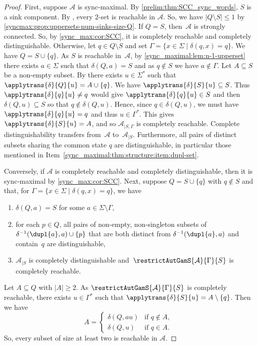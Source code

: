 \begin{proof}	
	First, suppose $\mathcal A$ is sync-maximal.
	By \cref{prelim:thm:SCC_sync_words}, $S$ is a sink component.
	By ,
	every $2$-set is reachable in $\mathcal A$.
	So, we have $|Q \setminus S| \le 1$ by \cref{syncmax:prop:uppersets-num-sinks-size-Q}.
	If $Q = S$, then~$\mathcal A$ is strongly connected.
	So, by \cref{sync_max:cor:SCC}, it is completely reachable
	and completely distinguishable.
	Otherwise, let $q \in Q \setminus S$ and set $\Gamma = \{ x \in \Sigma \mid \delta(q, x) = q \}$.
	We have $Q = S \cup \{q\}$.
	As $S$ is reachable in~$\mathcal A$, by \cref{sync_maximal:lem:n-1-upperset} there
	exists $a \in \Sigma$ such that $\delta(Q, a) = S$
	and as $q \notin S$ we have $a \notin \Gamma$.
	Let $A \subseteq S$ be a non-empty
	subset. By 
	there exists $u \in \Sigma^*$ such that
	$\applytrans{\delta}{Q}{u} = A \cup \{q\}$.
	We have $\applytrans{\delta}{S}{u} \subseteq S$.
	Thus $\applytrans{\delta}{q}{u} \ne q$
	would give $\applytrans{\delta}{q}{u} \in S$
	and then $\delta(Q, u) \subseteq S$
	so that $q \notin \delta(Q, u)$.
	Hence, since $q \in \delta(Q, u)$, we must have $\applytrans{\delta}{q}{u} = q$ and 
	thus $u \in \Gamma^*$.
	This gives $\applytrans{\delta}{S}{u} = A$, and so 
	$\mathcal A_{|S, \Gamma}$ is completely reachable. 
	Complete distinguishability transfers from~$\mathcal A$
	to~$\mathcal A_{|S}$.
	Furthermore, all pairs of distinct subsets sharing the common state $q$
	are distinguishable, in particular those mentioned in Item~\ref{sync_maximal:thm:structure:item:dupl-set}.
		
	Conversely, if $\mathcal A$ is completely reachable and completely
	distinguishable, then it is sync-maximal by \cref{sync_max:cor:SCC}.
	Next, suppose $Q = S \cup \{q\}$ with $q \notin S$ and that,
	for $\Gamma = \{ x \in \Sigma \mid \delta(q, x) = q \}$, we have
	\begin{enumerate}
	\item $\delta(Q, a) = S$ for some $a \in \Sigma \setminus \Gamma$,
	
	\item for each $p \in Q$, all pairs of non-empty, non-singleton subsets
	of $\delta^{-1}(\dupl{a}, a) \cup \{p\}$ that are both distinct from
	$\delta^{-1}(\dupl{a}, a)$ and contain~$q$ are distinguishable,
	
	\item $\mathcal A_{|S}$ is completely
	distinguishable and~$\restrictAutGamS{\mathcal A}{\Gamma}{S}$ is completely reachable.
	\end{enumerate}
	Let $A \subseteq Q$ with $|A| \ge 2$.
	As $\restrictAutGamS{\mathcal A}{\Gamma}{S}$ is completely reachable,
	there exists $u \in \Gamma^*$ such that $\applytrans{\delta}{S}{u} = A \setminus \{q\}$.
	Then we have
	\[
	A = \begin{cases}
		\delta(Q, au) & \text{if } q \notin A, \\
		\delta(Q, u)  & \text{if } q \in A.		
	\end{cases}
	\]	
	So, every subset of size at least two is reachable in $\mathcal A$.    
    

\end{proof}
